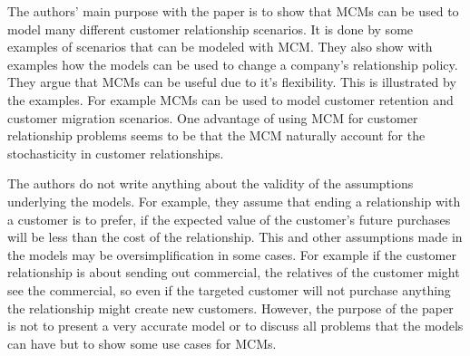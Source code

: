 \documentclass[11pt]{article}
\begin{document}

The authors' main purpose with the paper is to show that MCMs can be used to model many different customer relationship scenarios. It is done by some examples of scenarios that can be modeled with MCM. They also show with examples how the models can be used to change a company's relationship policy. They argue that MCMs can be useful due to it's flexibility. This is illustrated by the examples. For example MCMs can be used to model customer retention and customer migration scenarios. One advantage of using MCM for customer relationship problems seems to be that the MCM naturally account for the stochasticity in customer relationships. %

The authors do not write anything about the validity of the assumptions underlying the models. For example, they assume that ending a relationship with a customer is to prefer, if the expected value of the customer's future purchases will be less than the cost of the relationship. This and other assumptions made in the models may be oversimplification in some cases. For example if the customer relationship is about sending out commercial, the relatives of the customer might see the commercial, so even if the targeted customer will not purchase anything the relationship might create new customers. However, the purpose of the paper is not to present a very accurate model or to discuss all problems that the models can have but to show some use cases for MCMs.

\end{document}
